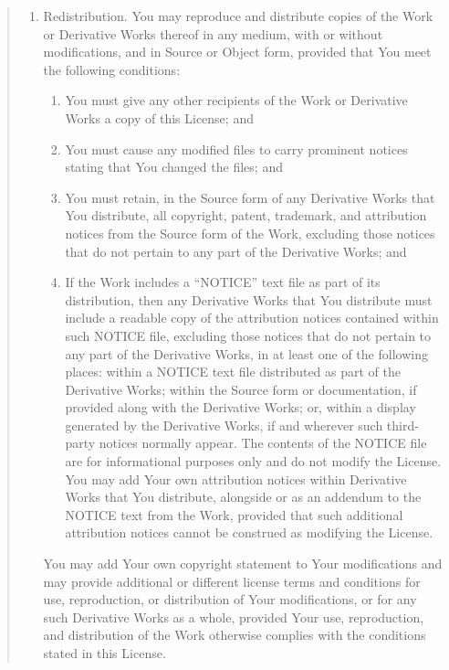 \documentclass[letterpaper,10pt,english]{sphinxmanual}
\begin{document}
\begin{quote}
\begin{enumerate}
\item {} 
Redistribution. You may reproduce and distribute copies of the
Work or Derivative Works thereof in any medium, with or without
modifications, and in Source or Object form, provided that You
meet the following conditions:
\begin{enumerate}
%
\item {} 
You must give any other recipients of the Work or
Derivative Works a copy of this License; and

\item {} 
You must cause any modified files to carry prominent notices
stating that You changed the files; and

\item {} 
You must retain, in the Source form of any Derivative Works
that You distribute, all copyright, patent, trademark, and
attribution notices from the Source form of the Work,
excluding those notices that do not pertain to any part of
the Derivative Works; and

\item {} 
If the Work includes a “NOTICE” text file as part of its
distribution, then any Derivative Works that You distribute must
include a readable copy of the attribution notices contained
within such NOTICE file, excluding those notices that do not
pertain to any part of the Derivative Works, in at least one
of the following places: within a NOTICE text file distributed
as part of the Derivative Works; within the Source form or
documentation, if provided along with the Derivative Works; or,
within a display generated by the Derivative Works, if and
wherever such third-party notices normally appear. The contents
of the NOTICE file are for informational purposes only and
do not modify the License. You may add Your own attribution
notices within Derivative Works that You distribute, alongside
or as an addendum to the NOTICE text from the Work, provided
that such additional attribution notices cannot be construed
as modifying the License.

\end{enumerate}

You may add Your own copyright statement to Your modifications and
may provide additional or different license terms and conditions
for use, reproduction, or distribution of Your modifications, or
for any such Derivative Works as a whole, provided Your use,
reproduction, and distribution of the Work otherwise complies with
the conditions stated in this License.


\end{enumerate}
\end{quote}
\end{document}
